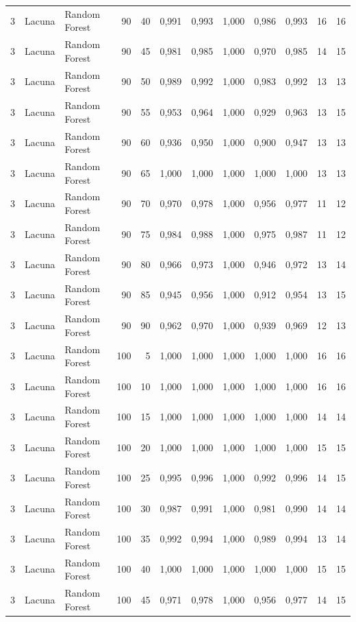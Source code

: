 \begin{longtable}{@{}rllrrrrrrrrr@{}}
3 & Lacuna & Random Forest & 90 & 40 & 0,991 & 0,993 & 1,000 & 0,986 & 0,993 & 16 & 16 \\
3 & Lacuna & Random Forest & 90 & 45 & 0,981 & 0,985 & 1,000 & 0,970 & 0,985 & 14 & 15 \\
3 & Lacuna & Random Forest & 90 & 50 & 0,989 & 0,992 & 1,000 & 0,983 & 0,992 & 13 & 13 \\
3 & Lacuna & Random Forest & 90 & 55 & 0,953 & 0,964 & 1,000 & 0,929 & 0,963 & 13 & 15 \\
3 & Lacuna & Random Forest & 90 & 60 & 0,936 & 0,950 & 1,000 & 0,900 & 0,947 & 13 & 13 \\
3 & Lacuna & Random Forest & 90 & 65 & 1,000 & 1,000 & 1,000 & 1,000 & 1,000 & 13 & 13 \\
3 & Lacuna & Random Forest & 90 & 70 & 0,970 & 0,978 & 1,000 & 0,956 & 0,977 & 11 & 12 \\
3 & Lacuna & Random Forest & 90 & 75 & 0,984 & 0,988 & 1,000 & 0,975 & 0,987 & 11 & 12 \\
3 & Lacuna & Random Forest & 90 & 80 & 0,966 & 0,973 & 1,000 & 0,946 & 0,972 & 13 & 14 \\
3 & Lacuna & Random Forest & 90 & 85 & 0,945 & 0,956 & 1,000 & 0,912 & 0,954 & 13 & 15 \\
3 & Lacuna & Random Forest & 90 & 90 & 0,962 & 0,970 & 1,000 & 0,939 & 0,969 & 12 & 13 \\
3 & Lacuna & Random Forest & 100 & 5 & 1,000 & 1,000 & 1,000 & 1,000 & 1,000 & 16 & 16 \\
3 & Lacuna & Random Forest & 100 & 10 & 1,000 & 1,000 & 1,000 & 1,000 & 1,000 & 16 & 16 \\
3 & Lacuna & Random Forest & 100 & 15 & 1,000 & 1,000 & 1,000 & 1,000 & 1,000 & 14 & 14 \\
3 & Lacuna & Random Forest & 100 & 20 & 1,000 & 1,000 & 1,000 & 1,000 & 1,000 & 15 & 15 \\
3 & Lacuna & Random Forest & 100 & 25 & 0,995 & 0,996 & 1,000 & 0,992 & 0,996 & 14 & 15 \\
3 & Lacuna & Random Forest & 100 & 30 & 0,987 & 0,991 & 1,000 & 0,981 & 0,990 & 14 & 14 \\
3 & Lacuna & Random Forest & 100 & 35 & 0,992 & 0,994 & 1,000 & 0,989 & 0,994 & 13 & 14 \\
3 & Lacuna & Random Forest & 100 & 40 & 1,000 & 1,000 & 1,000 & 1,000 & 1,000 & 15 & 15 \\
3 & Lacuna & Random Forest & 100 & 45 & 0,971 & 0,978 & 1,000 & 0,956 & 0,977 & 14 & 15 \\

\end{longtable}
